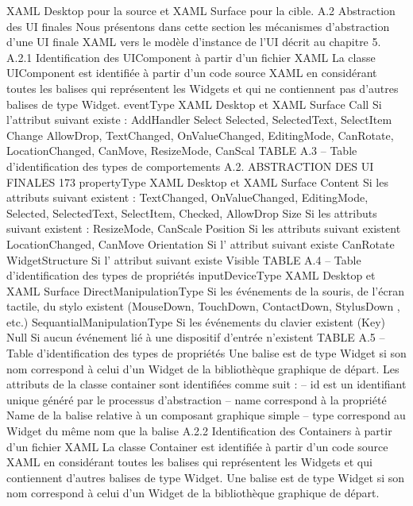 \documentclass{article}
\begin{document}
XAML Desktop pour la source et XAML Surface pour la cible.
A.2
Abstraction des UI ﬁnales
Nous pr\'{e}sentons dans cette section les m\'{e}canismes d’abstraction d’une UI ﬁnale XAML vers le
mod\`{e}le d’instance de l’UI d\'{e}crit au chapitre 5.
A.2.1
Identiﬁcation des UIComponent \`{a} partir d’un ﬁchier XAML
La classe UIComponent est identiﬁ\'{e}e \`{a} partir d’un code source XAML en consid\'{e}rant toutes les
balises qui repr\'{e}sentent les Widgets et qui ne contiennent pas d’autres balises de type Widget.
eventType
XAML Desktop et XAML Surface
Call
Si l’attribut suivant existe : AddHandler
Select
Selected, SelectedText, SelectItem
Change
AllowDrop, TextChanged, OnValueChanged, EditingMode, CanRotate,
LocationChanged, CanMove, ResizeMode, CanScal
TABLE A.3 – Table d’identiﬁcation des types de comportements
A.2. ABSTRACTION DES UI FINALES
173
propertyType
XAML Desktop et XAML Surface
Content
Si les attributs suivant existent : TextChanged, OnValueChanged,
EditingMode, Selected, SelectedText, SelectItem, Checked, AllowDrop
Size
Si les attributs suivant existent : ResizeMode, CanScale
Position
Si les attributs suivant existent LocationChanged, CanMove
Orientation
Si l’ attribut suivant existe CanRotate
WidgetStructure
Si l’ attribut suivant existe Visible
TABLE A.4 – Table d’identiﬁcation des types de propri\'{e}t\'{e}s
inputDeviceType
XAML Desktop et XAML Surface
DirectManipulationType
Si les \'{e}v\'{e}nements de la souris, de l’\'{e}cran tactile, du stylo
existent (MouseDown, TouchDown, ContactDown, StylusDown
, etc.)
SequantialManipulationType
Si les \'{e}v\'{e}nements du clavier existent (Key)
Null
Si aucun \'{e}v\'{e}nement li\'{e} \`{a} une dispositif d’entr\'{e}e n’existent
TABLE A.5 – Table d’identiﬁcation des types de propri\'{e}t\'{e}s
Une balise est de type Widget si son nom correspond \`{a} celui d’un Widget de la biblioth\`{e}que
graphique de d\'{e}part.
Les attributs de la classe container sont identiﬁ\'{e}es comme suit :
– id est un identiﬁant unique g\'{e}n\'{e}r\'{e} par le processus d’abstraction
– name correspond \`{a} la propri\'{e}t\'{e} Name de la balise relative \`{a} un composant graphique simple
– type correspond au Widget du m\^{e}me nom que la balise
A.2.2
Identiﬁcation des Containers \`{a} partir d’un ﬁchier XAML
La classe Container est identiﬁ\'{e}e \`{a} partir d’un code source XAML en consid\'{e}rant toutes les balises
qui repr\'{e}sentent les Widgets et qui contiennent d’autres balises de type Widget.
Une balise est de type Widget si son nom correspond \`{a} celui d’un Widget de la biblioth\`{e}que
graphique de d\'{e}part.
\end{document}
